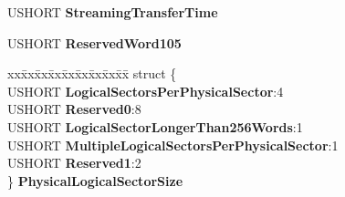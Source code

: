 \begin{DoxyCompactItemize}
U\+S\+H\+O\+RT {\bfseries Streaming\+Transfer\+Time}
\item 
\mbox{\label{struct___i_d_e_n_t_i_f_y___d_e_v_i_c_e___d_a_t_a_a99f9ee0f873efe0265f4497cf12c91ce}} 
U\+S\+H\+O\+RT {\bfseries Reserved\+Word105}
\item 
\mbox{\label{struct___i_d_e_n_t_i_f_y___d_e_v_i_c_e___d_a_t_a_a092b7efcfc05105d4ea848055e7359cc}} 
\begin{tabbing}
xx\=xx\=xx\=xx\=xx\=xx\=xx\=xx\=xx\=\kill
struct \{\\
\>USHORT {\bfseries LogicalSectorsPerPhysicalSector}:4\\
\>USHORT {\bfseries Reserved0}:8\\
\>USHORT {\bfseries LogicalSectorLongerThan256Words}:1\\
\>USHORT {\bfseries MultipleLogicalSectorsPerPhysicalSector}:1\\
\>USHORT {\bfseries Reserved1}:2\\
\} {\bfseries PhysicalLogicalSectorSize}\\


\end{tabbing}
\end{DoxyCompactItemize}
